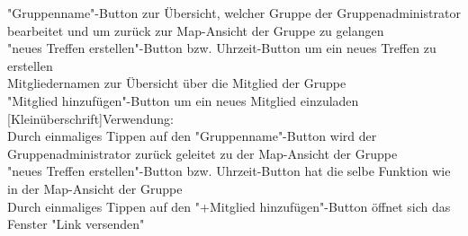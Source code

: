 "Gruppenname"-Button zur Übersicht, welcher Gruppe der Gruppenadministrator bearbeitet und um zurück zur Map-Ansicht der Gruppe zu gelangen\\
"neues Treffen erstellen"-Button bzw. Uhrzeit-Button um ein neues Treffen zu erstellen\\
Mitgliedernamen zur Übersicht über die Mitglied der Gruppe\\
"Mitglied hinzufügen"-Button um ein neues Mitglied einzuladen
[Kleinüberschrift]Verwendung:\\
Durch einmaliges Tippen auf den "Gruppenname"-Button wird der Gruppenadministrator zurück geleitet zu der Map-Ansicht der Gruppe\\
"neues Treffen erstellen"-Button bzw. Uhrzeit-Button hat die selbe Funktion wie in der Map-Ansicht der Gruppe\\
Durch einmaliges Tippen auf den "+Mitglied hinzufügen"-Button öffnet sich das Fenster "Link versenden"\\ \\

